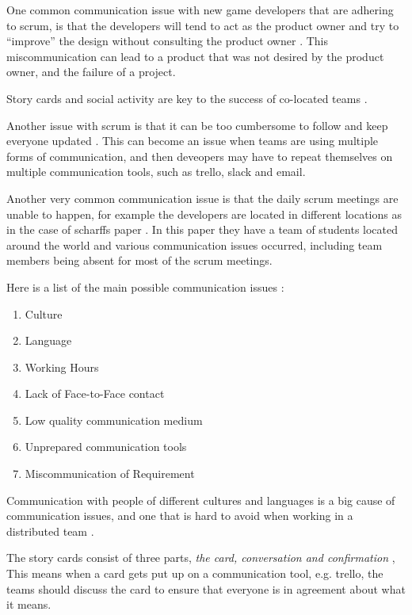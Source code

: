 \documentclass{scrartcl}
\begin{document}
One common communication issue with new game developers that are adhering to scrum, is that the developers will tend to act as the product owner and try to ``improve'' the design without consulting the product owner \cite{krasteva2008}. This miscommunication can lead to a product that was not desired by the product owner, and the failure of a project. \par

 Story cards and social activity are key to the success of co-located teams \cite{abdullah2011}. \par

Another issue with scrum is that it can be too cumbersome to follow and keep everyone updated \cite{scharff2012}. This can become an issue when teams are using multiple forms of communication, and then deveopers may have to repeat themselves on multiple communication tools, such as trello, slack and email. \par

Another very common communication issue is that the daily scrum meetings are unable to happen, for example the developers are located in different locations as in the case of scharffs paper \cite{scharff2012}. In this paper they have a team of students located around the world and various communication issues occurred, including team members being absent for most of the scrum meetings. 

Here is a list of the main possible communication issues \cite{joshi2013}: 

\begin{enumerate}
\item Culture
\item Language
\item Working Hours
\item Lack of Face-to-Face contact
\item Low quality communication medium
\item Unprepared communication tools
\item Miscommunication of Requirement
\end{enumerate}

Communication with people of different cultures and languages is a big cause of communication issues, and one that is hard to avoid when working in a distributed team \cite{cohn2003}.

The story cards consist of three parts, \textit{the card, conversation and confirmation} \cite{abdullah2011}, This means when a card gets put up on a communication tool, e.g. trello, the teams should discuss the card to ensure that everyone is in agreement about what it means. 
\end{document}
